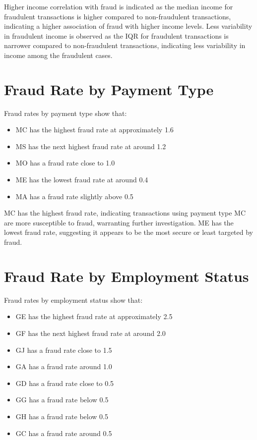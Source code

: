 \documentclass[12pt,a4paper]{report}
\begin{document}
Higher income correlation with fraud is indicated as the median income for fraudulent transactions is higher compared to non-fraudulent transactions, indicating a higher association of fraud with higher income levels. Less variability in fraudulent income is observed as the IQR for fraudulent transactions is narrower compared to non-fraudulent transactions, indicating less variability in income among the fraudulent cases.

\section{Fraud Rate by Payment Type}

Fraud rates by payment type show that:

\begin{itemize}
    \item MC has the highest fraud rate at approximately 1.6%
    \item MS has the next highest fraud rate at around 1.2%
    \item MO has a fraud rate close to 1.0%
    \item ME has the lowest fraud rate at around 0.4%
    \item MA has a fraud rate slightly above 0.5%
\end{itemize}

MC has the highest fraud rate, indicating transactions using payment type MC are more susceptible to fraud, warranting further investigation. ME has the lowest fraud rate, suggesting it appears to be the most secure or least targeted by fraud.

\section{Fraud Rate by Employment Status}

Fraud rates by employment status show that:

\begin{itemize}
    \item GE has the highest fraud rate at approximately 2.5%
    \item GF has the next highest fraud rate at around 2.0%
    \item GJ has a fraud rate close to 1.5%
    \item GA has a fraud rate around 1.0%
    \item GD has a fraud rate close to 0.5%
    \item GG has a fraud rate below 0.5%
    \item GH has a fraud rate below 0.5%
    \item GC has a fraud rate around 0.5%
\end{itemize}
\end{document}
